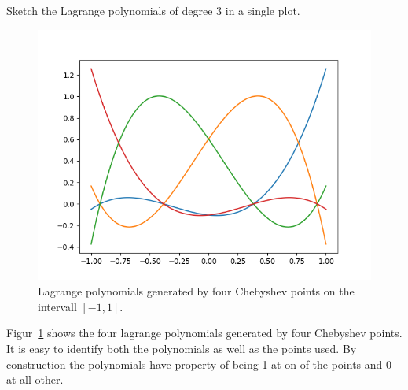 \begin{problem}
  Sketch the Lagrange polynomials of degree 3 in a single plot.
\end{problem}

\begin{solution}
  \begin{figure}[!ht]
    \centering
    \includegraphics[scale = 0.5]{./code/task_3.png}
    \caption{Lagrange polynomials generated by four Chebyshev points on
      the intervall $[-1, 1]$.}
    \label{fig:3}
  \end{figure}
  Figur~\ref{fig:3} shows the four lagrange polynomials generated
  by four Chebyshev points. It is easy to identify both the polynomials
  as well as the points used. By construction the polynomials have
  property of being 1 at on of the points and 0 at all other.
\end{solution}

